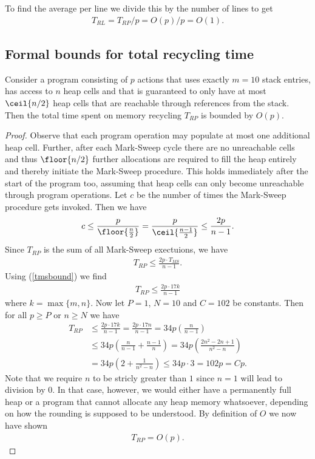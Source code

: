 \documentclass{article}
\begin{document}
To find the average per line we divide this by the number of lines to get
\begin{align*}
    T_{RL} = T_{RP}/p = O(p)/p = O(1).
\end{align*}


\subsection{Formal bounds for total recycling time}

\begin{claim*}
    Consider a program consisting of $p$ actions that uses exactly $m=10$
    stack entries, has access to $n$ heap cells and that is guaranteed to only
    have at most $\ceil{n/2}$ heap cells that are reachable through references
    from the stack. Then the total time spent on memory recycling $T_{RP}$ is
    bounded by $O(p)$.
\end{claim*}
\begin{proof}
    Observe that each program operation may populate at most one additional heap cell.
    Further, after each Mark-Sweep cycle there are no unreachable cells and thus
    $\floor{n/2}$ further allocations are required to fill the heap entirely and
    thereby initiate the Mark-Sweep procedure. This holds immediately after
    the start of the program too, assuming that heap cells can only become unreachable
    through program operations. Let $c$ be the number of times the Mark-Sweep
    procedure gets invoked. Then we have
    \begin{align*}
        c \leq \frac{p}{\floor{\frac{n}{2}}} = \frac{p}{\ceil{\frac{n-1}{2}}} \leq \frac{2p}{n-1}.
    \end{align*}
    Since $T_{RP}$ is the sum of all Mark-Sweep exectuions, we have
    \begin{align*}
        T_{RP} \leq\frac{2p \cdot T_{MS}}{n-1}. 
    \end{align*}
    Using (\ref{tmsbound}) we find
    \begin{align}
        \label{trbound}
        T_{RP}\leq\frac{2p\cdot 17k}{n-1}
    \end{align}
    where $k=\max\{m,n\}$. Now let $P=1$, $N=10$ and $C=102$ be constants. Then
    for all $p\geq P$ or $n\geq N$ we have
    \begin{align*}
        T_{RP} &\leq \frac{2p\cdot 17k}{n-1} = \frac{2p\cdot 17n}{n-1} = 34p\left(\frac{n}{n-1}\right)\\
        &\leq 34p\left(\frac{n}{n-1}+\frac{n-1}{n}\right)=34p\left(\frac{2n^2-2n+1}{n^2-n}\right)\\
        &=34p\left(2+\frac{1}{n^2-n}\right)\leq 34p\cdot 3 = 102p = Cp.
    \end{align*}
    Note that we require $n$ to be stricly greater than $1$ since $n=1$ will lead to
    division by $0$. In that case, however, we would either have a permanently full heap
    or a program that cannot allocate any heap memory whatsoever, depending on how the
    rounding is supposed to be understood.
    By definition of $O$ we now have shown
    \begin{align*}
        T_{RP} = O(p).
    \end{align*}
\end{proof}
\end{document}
